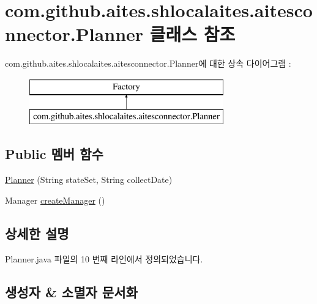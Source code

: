 \hypertarget{classcom_1_1github_1_1aites_1_1shlocalaites_1_1aitesconnector_1_1_planner}{}\section{com.\+github.\+aites.\+shlocalaites.\+aitesconnector.\+Planner 클래스 참조}
\label{classcom_1_1github_1_1aites_1_1shlocalaites_1_1aitesconnector_1_1_planner}
com.\+github.\+aites.\+shlocalaites.\+aitesconnector.\+Planner에 대한 상속 다이어그램 \+: \begin{figure}[H]
\begin{center}
\leavevmode
\includegraphics[height=2.000000cm]{classcom_1_1github_1_1aites_1_1shlocalaites_1_1aitesconnector_1_1_planner}
\end{center}
\end{figure}
\subsection*{Public 멤버 함수}
\begin{DoxyCompactItemize}
\item 
\mbox{\hyperlink{classcom_1_1github_1_1aites_1_1shlocalaites_1_1aitesconnector_1_1_planner_aa986c5e60598bb1d33e59a27dbd93253}{Planner}} (String state\+Set, String collect\+Date)
\item 
Manager \mbox{\hyperlink{classcom_1_1github_1_1aites_1_1shlocalaites_1_1aitesconnector_1_1_planner_ad06f14c8d32f7b94c59f7aa43c213a23}{create\+Manager}} ()
\end{DoxyCompactItemize}


\subsection{상세한 설명}


Planner.\+java 파일의 10 번째 라인에서 정의되었습니다.



\subsection{생성자 \& 소멸자 문서화}
\mbox{\label{classcom_1_1github_1_1aites_1_1shlocalaites_1_1aitesconnector_1_1_planner_aa986c5e60598bb1d33e59a27dbd93253}} 
